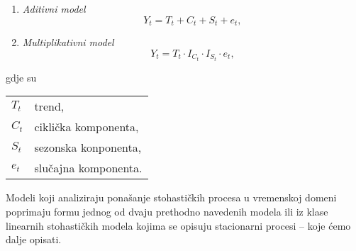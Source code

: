 \documentclass[a4paper,12pt,oneside]{memoir}
\begin{document}
            \begin{enumerate}
                \item \textit{Aditivni model} \\

                    \begin{equation}
                        Y_t=T_t+C_t+S_t+e_t,
                    \end{equation}

                \item \textit{Multiplikativni model} \\
                
                    \begin{equation}
                        Y_t=T_t\cdot I_{C_t}\cdot I_{S_t}\cdot e_t,
                    \end{equation}

            \end{enumerate}

            gdje su

            \begin{table}[H]
                \centering
                \begin{tabular*}{0.9\textwidth}{l p{13cm}}
                    \textit{$T_t$} & trend\footnotemark ,\\
                    \textit{$C_t$} & ciklička komponenta\footnotemark ,\\
                    \textit{$S_t$} & sezonska konponenta\footnotemark ,\\
                    \textit{$e_t$} & slučajna komponenta\footnotemark .
                \end{tabular*}
            \end{table}

            
            Modeli koji analiziraju ponašanje stohastičkih procesa u vremenskoj domeni poprimaju formu jednog od dvaju prethodno navedenih modela ili iz klase linearnih stohastičkih modela kojima se opisuju stacionarni procesi -- koje ćemo dalje opisati.
\end{document}
